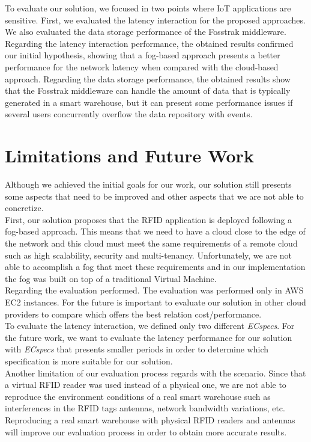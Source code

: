 To evaluate our solution, we focused in two points where \gls{IoT} applications are sensitive. First,
we evaluated the latency interaction for the proposed approaches. We also evaluated the data storage
performance of the Fosstrak middleware. Regarding the latency interaction performance, the obtained
results confirmed our initial hypothesis, showing that a fog-based approach presents a better
performance for the network latency when compared with the cloud-based approach. Regarding the data
storage performance, the obtained results show that the Fosstrak middleware can handle the amount
of data that is typically generated in a smart warehouse, but it can present some performance issues
if several users concurrently overflow the data repository with events.

\section{Limitations and Future Work}
\label{sec:limitations_and_future_work}
Although we achieved the initial goals for our work, our solution still presents some aspects that
need to be improved and other aspects that we are not able to concretize.\\

First, our solution proposes that the \gls{RFID} application is deployed following a fog-based approach.
This means that we need to have a cloud close to the edge of the network and this cloud must meet
the same requirements of a remote cloud such as high scalability, security and multi-tenancy.
Unfortunately, we are not able to accomplish a fog that meet these requirements and in our implementation
the fog was built on top of a traditional Virtual Machine.\\

Regarding the evaluation performed. The evaluation was performed only in \gls{AWS} \gls{EC2} instances.
For the future is important to evaluate our solution in other cloud providers to compare which offers
the best relation cost/performance.\\

To evaluate the latency interaction, we defined only two different \textit{ECspecs}. For the future work,
we want to evaluate the latency performance for our solution with \textit{ECspecs} that presents smaller
periods in order to determine which specification is more suitable for our solution.\\

Another limitation of our evaluation process regards with the scenario. Since that a virtual \gls{RFID}
reader was used instead of a physical one, we are not able to reproduce the environment conditions
of a real smart warehouse such as interferences in the \gls{RFID} tags antennas, network bandwidth
variations, etc. Reproducing a real smart warehouse with physical \gls{RFID} readers and antennas
will improve our evaluation process in order to obtain more accurate results.\\

